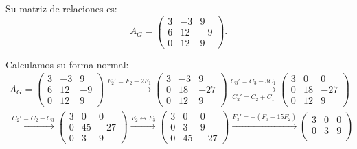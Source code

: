 \begin{ejercicio}
\begin{enumerate}
        Su matriz de relaciones es:
        \begin{equation*}
            A_G = \begin{pmatrix}
                3 & -3 & 9 \\
                6 & 12 & -9 \\
                0 & 12 & 9
            \end{pmatrix}.
        \end{equation*}

        Calculamos su forma normal:
        \begin{multline*}
            A_G = \begin{pmatrix}
                3 & -3 & 9 \\
                6 & 12 & -9 \\
                0 & 12 & 9
            \end{pmatrix}
            \xrightarrow{F_2'=F_2-2F_1}
            \begin{pmatrix}
                3 & -3 & 9 \\
                0 & 18 & -27 \\
                0 & 12 & 9
            \end{pmatrix}
            \xrightarrow[C_2'=C_2+C_1]{C_3'=C_3-3C_1}
            \begin{pmatrix}
                3 & 0 & 0 \\
                0 & 18 & -27 \\
                0 & 12 & 9
            \end{pmatrix}\\
            \xrightarrow{C_2'=C_2-C_3}
            \begin{pmatrix}
                3 & 0 & 0 \\
                0 & 45 & -27 \\
                0 & 3 & 9
            \end{pmatrix}
            \xrightarrow{F_2\leftrightarrow F_3}
            \begin{pmatrix}
                3 & 0 & 0 \\
                0 & 3 & 9 \\
                0 & 45 & -27
            \end{pmatrix}
            \xrightarrow{F_3'=-(F_3-15F_2)}
            \begin{pmatrix}
                3 & 0 & 0 \\
                0 & 3 & 9 \\

\end{pmatrix}
\end{multline*}
\end{enumerate}
\end{ejercicio}
